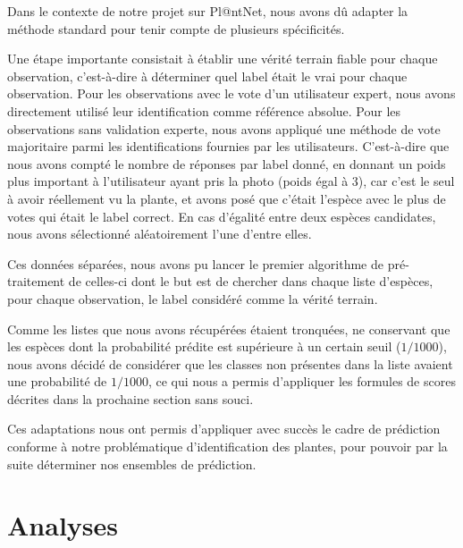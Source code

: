 \documentclass[a4paper,12pt]{article}
\begin{document}
Dans le contexte de notre projet sur Pl@ntNet, nous avons dû adapter la méthode standard pour tenir compte de plusieurs spécificités. 

\vspace{0.2cm}

Une étape importante consistait à établir une vérité terrain fiable pour chaque observation, c'est-à-dire à déterminer quel label était le vrai pour chaque observation. Pour les observations avec le vote d'un utilisateur expert, nous avons directement utilisé leur identification comme référence absolue. Pour les observations sans validation experte, nous avons appliqué une méthode de vote majoritaire parmi les identifications fournies par les utilisateurs. C'est-à-dire que nous avons compté le nombre de réponses par label donné, en donnant un poids plus important à l'utilisateur ayant pris la photo (poids égal à $3$), car c'est le seul à avoir réellement vu la plante, et avons posé que c'était l'espèce avec le plus de votes qui était le label correct. En cas d'égalité entre deux espèces candidates, nous avons sélectionné aléatoirement l'une d'entre elles.

\vspace{0.2cm}

Ces données séparées, nous avons pu lancer le premier algorithme de pré-traitement de celles-ci dont le but est de chercher dans chaque liste d'espèces, pour chaque observation, le label considéré comme la vérité terrain.

\vspace{0.2cm}

Comme les listes que nous avons récupérées étaient tronquées, ne conservant que les espèces dont la probabilité prédite est supérieure à un certain seuil ($1/1000$), nous avons décidé de considérer que les classes non présentes dans la liste avaient une probabilité de $1/1000$, ce qui nous a permis d'appliquer les formules de scores décrites dans la prochaine section sans souci.

\vspace{0.2cm}

Ces adaptations nous ont permis d'appliquer avec succès le cadre de prédiction conforme à notre problématique d'identification des plantes, pour pouvoir par la suite déterminer nos ensembles de prédiction.


\section{Analyses}
\end{document}
